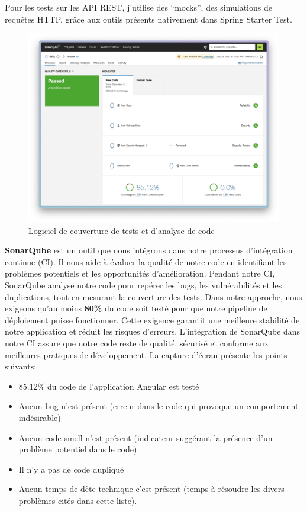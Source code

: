 \documentclass[a4paper, 11pt]{report}
\begin{document}
Pour les tests sur les API REST, j'utilise des ``mocks'', des
simulations de requêtes HTTP, grâce aux outils présents nativement dans
Spring Starter Test.
  \begin{figure}[H]
      \centering
      \includegraphics[scale=0.35,center]{screenshots/felix-sonar.png}
      \caption{Logiciel de couverture de tests et d'analyse de code}
  \end{figure}
\textbf{SonarQube} est un outil que nous intégrons dans notre processus
d'intégration continue (CI). Il nous aide à évaluer la qualité de notre
code en identifiant les problèmes potentiels et les opportunités
d'amélioration. Pendant notre CI, SonarQube analyse notre code pour
repérer les bugs, les vulnérabilités et les duplications, tout en
mesurant la couverture des tests.
\newline
\newline
Dans notre approche, nous exigeons qu'au moins \textbf{80\%} du code
soit testé pour que notre pipeline de déploiement puisse fonctionner.
Cette exigence garantit une meilleure stabilité de notre application et
réduit les risques d'erreurs. L'intégration de SonarQube dans notre CI
assure que notre code reste de qualité, sécurisé et conforme aux
meilleures pratiques de développement.
\newline
\newline
La capture d'écran présente les points suivants:
\begin{itemize}
\tightlist
\item
  85.12\% du code de l'application Angular est testé
\item
  Aucun bug n'est présent (erreur dans le code qui provoque un comportement
  indésirable)
\item
  Aucun code smell n'est présent (indicateur suggérant la présence d'un
  problème potentiel dans le code)
\item
  Il n'y a pas de code dupliqué
\item
  Aucun temps de dête technique c'est présent (temps à résoudre les
  divers problèmes cités dans cette liste).
\end{itemize}
\end{document}
